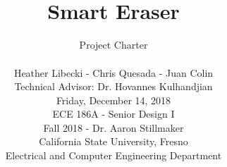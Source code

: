 
\title{ \hfill  \vspace{2in} \\Smart Eraser \vspace{0.05in} }	

\author{Project Charter \\ \vspace{0.6in}
\vspace{12pt} 

Heather Libecki - Chris Quesada - Juan Colin \\
\vspace{5pt}
Technical Advisor: Dr. Hovannes Kulhandjian	\\				%
\vspace{12pt} 								%
Friday, December 14, 2018 \\ 
\vspace{3.2in}
ECE 186A - Senior Design I \\ 					%
Fall 2018 - Dr. Aaron Stillmaker \\
\vspace{5pt}
California State University, Fresno \\
Electrical and Computer Engineering Department \\ 

\vspace{2in}								%


\vspace{4in}}								%




\maketitle									%
\thispagestyle{empty}						%
\newpage
\thispagestyle{empty}

